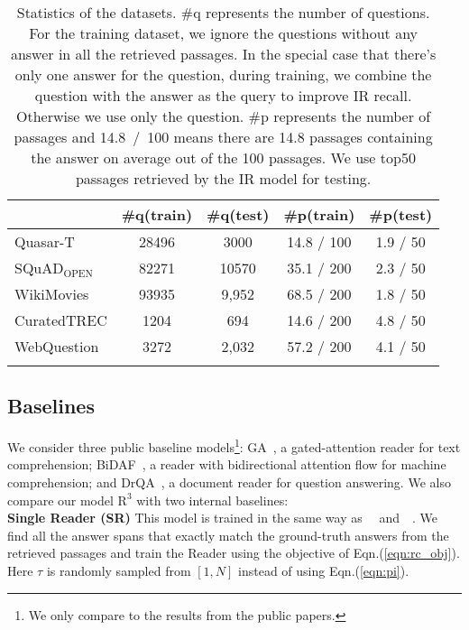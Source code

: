 \documentclass[letterpaper]{article} %
\begin{document}
\begin{table}[]
\centering
\small
\begin{tabular}{lcccc}
\toprule
            & \#q(train) & \#q(test)  & \#p(train) & \#p(test)\\
\midrule
Quasar-T    & 28496 & 3000  & 14.8 / 100 & 1.9 / 50 \\
SQuAD$_\text{OPEN}$       & 82271 & 10570 & 35.1 / 200 & 2.3 / 50 \\
WikiMovies  & 93935 & 9,952 & 68.5 / 200 & 1.8 / 50 \\
CuratedTREC & 1204  & 694   & 14.6 / 200 & 4.8 / 50 \\
WebQuestion & 3272  & 2,032 & 57.2 / 200 & 4.1 / 50 \\
\bottomrule
\normalsize
\end{tabular}
\caption{Statistics of the datasets. \#q represents the number of questions. For the training dataset, we ignore the questions without any answer in all the retrieved passages. In the special case that there's only one answer for the question, during training, we combine the question with the answer as the query to improve IR recall.  Otherwise we use only the question. \#p represents the number of passages and 14.8~/~100 means there are 14.8 passages containing the answer on average out of the 100 passages. We use top50 passages retrieved by the IR model for testing. }
\label{datasets}
\end{table}

\subsection{Baselines}
We consider three public baseline models\footnote{We only compare to the results from the public papers.}: GA~\cite{dhingra2016gated,dhingra2017quasar}, a gated-attention reader for text comprehension; BiDAF~\cite{seo2016bidirectional}, a reader with bidirectional attention flow for machine comprehension; and DrQA~\cite{chen2017reading}, a document reader for question answering. We also compare our model $\text{R}^3$ with two internal baselines:\\


\noindent \textbf{Single Reader (SR)}\quad 
This model is trained in the same way as~\citeauthor{chen2017reading}~\citeyear{chen2017reading} and~\citeauthor{dhingra2017quasar}~\citeyear{dhingra2017quasar}. We find all the answer spans that exactly match the ground-truth answers from the retrieved passages and train the  Reader using the objective of Eqn.(\ref{eqn:rc_obj}).  Here $\tau$ is randomly sampled from $[1,N]$ instead of using Eqn.(\ref{eqn:pi}).\\
\end{document}
